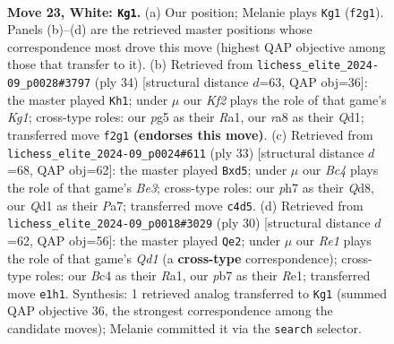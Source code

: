 \documentclass[11pt]{article}
\begin{document}
\begin{figure}[p]
\label{fig:thought-m42}
\end{figure}

\clearpage

\begin{figure}[p]\centering
\begin{subfigure}{0.46\textwidth}\centering
\resizebox{\linewidth}{!}{%
\newchessgame
\chessboard[
  setfen={r1b5/pp1nq1kp/2p1r1p1/6p1/2BPN3/5PP1/PP3K1P/2RQR3 w - - 1 23},
  showmover=false,
  pgfstyle=straightmove, color=movearrow, markmove={f2-g1}
]}
\caption{}
\end{subfigure}\hfill
\begin{subfigure}{0.46\textwidth}\centering
\resizebox{\linewidth}{!}{%
\newchessgame
\chessboard[
  setfen={r4rk1/1p3pp1/1q3b1p/p2Pn3/P2N4/6P1/1PP3BP/R2Q1RK1 w - - 1 18},
  showmover=false,
  pgfstyle=straightmove, color=movearrow, markmove={g1-h1}
]}
\caption{}
\end{subfigure}
\\[4pt]
\begin{subfigure}{0.46\textwidth}\centering
\resizebox{\linewidth}{!}{%
\newchessgame
\chessboard[
  setfen={r2qk2r/ppp2p2/3pb2p/3Nn2P/2PQ4/5P2/PP4P1/2KR1B1R b kq - 0 17},
  showmover=false,
  pgfstyle=straightmove, color=movearrow, markmove={e6-d5}
]}
\caption{}
\end{subfigure}\hfill
\begin{subfigure}{0.46\textwidth}\centering
\resizebox{\linewidth}{!}{%
\newchessgame
\chessboard[
  setfen={rnbr2k1/pp3ppp/2p2q2/8/P2N4/6PP/1PP2PB1/R2QR1K1 w - - 2 16},
  showmover=false,
  pgfstyle=straightmove, color=movearrow, markmove={d1-e2}
]}
\caption{}
\end{subfigure}
\caption{\textbf{Move 23, White: \texttt{Kg1}.} (a) Our position; Melanie plays \texttt{Kg1} (\texttt{f2g1}). Panels (b)--(d) are the retrieved master positions whose correspondence most drove this move (highest QAP objective among those that transfer to it). (b) Retrieved from \texttt{lichess\_elite\_2024-09\_p0028\#3797} (ply 34) [structural distance $d$=63, QAP obj=36]: the master played \texttt{Kh1}; under $\mu$ our \emph{Kf2} plays the role of that game's \emph{Kg1}; cross-type roles: our \emph{p}g5 as their \emph{R}a1, our \emph{r}a8 as their \emph{Q}d1; transferred move \texttt{f2g1} \textbf{(endorses this move)}. (c) Retrieved from \texttt{lichess\_elite\_2024-09\_p0024\#611} (ply 33) [structural distance $d$=68, QAP obj=62]: the master played \texttt{Bxd5}; under $\mu$ our \emph{Bc4} plays the role of that game's \emph{Be3}; cross-type roles: our \emph{p}h7 as their \emph{Q}d8, our \emph{Q}d1 as their \emph{P}a7; transferred move \texttt{c4d5}. (d) Retrieved from \texttt{lichess\_elite\_2024-09\_p0018\#3029} (ply 30) [structural distance $d$=62, QAP obj=56]: the master played \texttt{Qe2}; under $\mu$ our \emph{Re1} plays the role of that game's \emph{Qd1} (a \textbf{cross-type} correspondence); cross-type roles: our \emph{B}c4 as their \emph{R}a1, our \emph{p}b7 as their \emph{R}e1; transferred move \texttt{e1h1}. Synthesis: 1 retrieved analog transferred to \texttt{Kg1} (summed QAP objective 36, the strongest correspondence among the candidate moves); Melanie committed it via the \texttt{search} selector.}

\end{figure}
\end{document}
